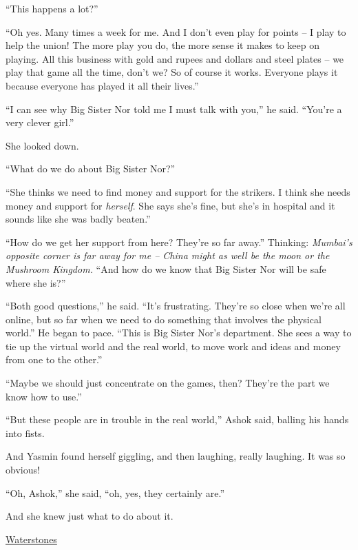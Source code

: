 ``This happens a lot?''

``Oh yes. Many times a week for me. And I don't even play for points
-- I play to help the union! The more play you do, the more sense
it makes to keep on playing. All this business with gold and rupees
and dollars and steel plates -- we play that game all the time,
don't we? So of course it works. Everyone plays it because everyone
has played it all their lives.''

``I can see why Big Sister Nor told me I must talk with you,'' he
said. ``You're a very clever girl.''

She looked down.

``What do we do about Big Sister Nor?''

``She thinks we need to find money and support for the strikers. I
think she needs money and support for \emph{herself}. She says
she's fine, but she's in hospital and it sounds like she was badly
beaten.''

``How do we get her support from here? They're so far away.''
Thinking:
\emph{Mumbai's opposite corner is far away for me -- China might as well be the moon or the Mushroom Kingdom.}
``And how do we know that Big Sister Nor will be safe where she
is?''

``Both good questions,'' he said. ``It's frustrating. They're so close
when we're all online, but so far when we need to do something that
involves the physical world.'' He began to pace. ``This is Big Sister
Nor's department. She sees a way to tie up the virtual world and
the real world, to move work and ideas and money from one to the
other.''

``Maybe we should just concentrate on the games, then? They're the
part we know how to use.''

``But these people are in trouble in the real world,'' Ashok said,
balling his hands into fists.

And Yasmin found herself giggling, and then laughing, really
laughing. It was so obvious!

``Oh, Ashok,'' she said, ``oh, yes, they certainly are.''

And she knew just what to do about it.

\tb

{\href{http://www.waterstones.com}{Waterstones}}

